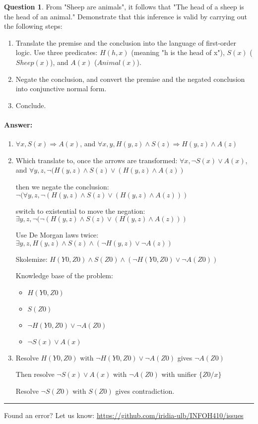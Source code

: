 \documentclass[11pt,a4paper]{article}
\theoremstyle{definition}%
\newtheorem{Q}{Question}[] %
\newcommand{\reponse}[1]{%
\ifthenelse {\boolean{corrige}} {\paragraph{Answer:} \color{darkblue}   #1\color{black}} {}
}
\begin{document}
\begin{Q}
From "Sheep are animals", it follows that "The head of a sheep is the
head of an animal." Demonstrate that this inference is valid by
carrying out the following steps:
\begin{enumerate}
    \item Translate the premise and the conclusion into the language of first-order logic. Use three predicates: $H(h,x)$ (meaning "h is the head of x"), $S(x)$ ($Sheep(x)$), and $A(x)$ ($Animal(x)$).
    \item Negate the conclusion, and convert the premise and the negated conclusion into conjunctive normal form.
    \item Conclude.
\end{enumerate}

\reponse {

\begin{enumerate}
    \item $\forall x, S(x) \Rightarrow A(x)$, and $\forall x,y, H(y,z) \wedge S(z) \Rightarrow H(y,z) \wedge A(z)$

    \item Which translate to, once the arrows are transformed:
        $\forall x, \neg S(x) \vee A(x)$, and $\forall y,z, \neg (H(y,z) \wedge S(z) \vee (H(y,z) \wedge A(z) )$

        then we negate the conclusion:
        $\neg (\forall y,z, \neg (H(y,z) \wedge S(z) \vee (H(y,z) \wedge A(z) ))$
        
        switch to existential to move the negation:
        $\exists y,z,\neg( \neg (H(y,z) \wedge S(z) \vee (H(y,z) \wedge A(z) ))$
        
        Use De Morgan laws twice:
        $\exists y,z, H(y,z) \wedge S(z) \wedge (\neg H(y,z) \vee \neg A(z) )$

        Skolemize:
        $H(Y0,Z0) \wedge S(Z0) \wedge (\neg H(Y0,Z0) \vee \neg A(Z0))$

        Knowledge base of the problem:
        \begin{itemize}
            \item $H(Y0,Z0)$
            \item $S(Z0)$
            \item $\neg H(Y0,Z0) \vee \neg A(Z0) $
            \item $\neg S(x)  \vee A(x)$

        \end{itemize}

    \item Resolve $H(Y0,Z0)$ with $\neg H(Y0,Z0) \vee \neg A(Z0) $ gives $\neg A(Z0)$ 

        Then resolve $\neg S(x)  \vee A(x)$ with $\neg A(Z0)$ with unifier $\{ Z0/x \}$

        Resolve $\neg S(Z0)$ with $S(Z0)$ gives contradiction.






\end{enumerate}

}
\end{Q}

\noindent
\rule{\textwidth}{0.4pt}
\footnotesize{Found an error? Let us know: \url{https://github.com/iridia-ulb/INFOH410/issues}}
\end{document}
